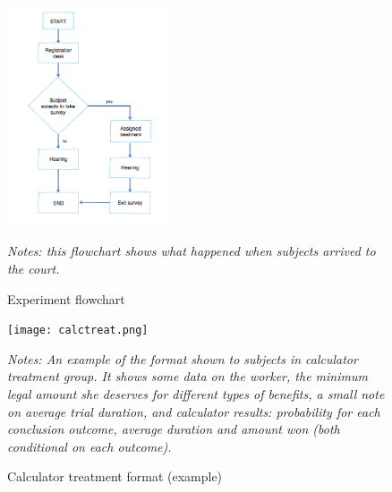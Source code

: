 \documentclass[11pt]{article}
\begin{document}
\begin{figure}[H]
   \caption{Experiment flowchart}
   \label{treatment_flowchart}
    \begin{center}
    \includegraphics[width=0.42\textwidth]{./Figuras/Experiment_flowchart.png}
    \end{center}
    \footnotesize
    \textit{Notes: this flowchart shows what happened when subjects arrived to the court.}
\end{figure}
    



\begin{figure}[H]
    \caption{Calculator treatment format (example)}
    \label{calc_template}
    \begin{center}
        \texttt{[image: calctreat.png]}
        \end{center}
        {\footnotesize \textit{Notes: An example of the format shown to subjects in calculator treatment group. It shows some data on the worker, the minimum legal amount she deserves for different types of benefits, a small note on average trial duration, and calculator results: probability for each conclusion outcome, average duration and amount won (both conditional on each outcome).}}
\end{figure}
\end{document}

